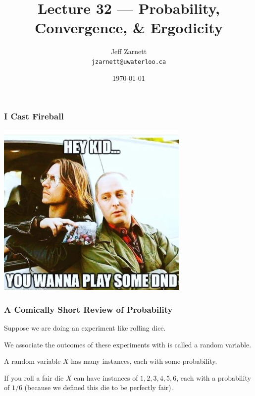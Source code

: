 

\title{Lecture 32 --- Probability, Convergence, \& Ergodicity}

\author{Jeff Zarnett\\ \small \texttt{jzarnett@uwaterloo.ca}}
\date{\today}




\begin{frame}
  \titlepage

 \end{frame}



\begin{frame}
\frametitle{I Cast Fireball}

\begin{center}
	\includegraphics[width=0.7\textwidth]{images/dnd.jpg}
\end{center}


\end{frame}



\begin{frame}
\frametitle{A Comically Short Review of Probability}

Suppose we are doing an experiment like rolling dice.

We associate the outcomes of these experiments with is called a random variable.

A random variable $X$ has many instances, each with some probability.

If you roll a fair die $X$ can have instances of ${1, 2, 3, 4, 5, 6}$, each with a probability of $1/6$ (because we defined this die to be perfectly fair).


\end{frame}



